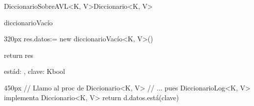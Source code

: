 \documentclass[10pt,a4paper]{article}
\begin{document}
\vspace{0.5em}
\begin{ModuloImplements}{DiccionarioSobreAVL<K, V>}{Diccionario<K, V>}
  \begin{Vars}
  \end{Vars}
  \begin{proc}{diccionarioVacío}{}{}
    \begin{ImplementationCode}{320px}
      res.datos:= new diccionarioVacío<K, V>()

      return res
    \end{ImplementationCode}
  \end{proc}
  \begin{proc}{está}{\In d: , \In clave: K}{bool}
    \begin{ImplementationCode}{450px}
      // Llamo al proc de Diccionario<K, V>
      // ... pues DiccionarioLog<K, V> implementa Diccionario<K, V>
      return d.datos.está(clave)
    \end{ImplementationCode}
  \end{proc}
\end{ModuloImplements}
\end{document}
